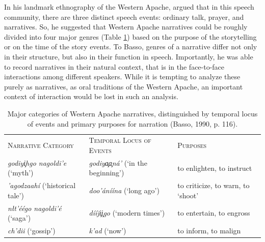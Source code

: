 \documentclass[12pt]{article}
\begin{document}
In his landmark ethnography of the Western Apache, \textcite{basso1990} argued that in this speech community, there are three distinct speech events: ordinary talk, prayer, and narratives. So, he suggested that Western Apache narratives could be roughly divided into four major genres (Table \ref{basso}) based on the purpose of the storytelling or on the time of the story events. To Basso, genres of a narrative differ not only in their structure, but also in their function in speech. Importantly, he was able to record narratives in their natural context, that is in the face-to-face interactions among different speakers. While it is tempting to analyze these purely as narratives, as oral traditions of the Western Apache, an important context of interaction would be lost in such an analysis.
\begin{table}[h]
\centering
\caption{Major categories of Western Apache narratives, distinguished by temporal locus of events and primary purposes for narration (Basso, 1990, p. 116).}
\label{basso}
\begin{tabular}{|p{2in} p{2.4in} p{1.6in}|} 
\hline
\textsc{Narrative Category} & \textsc{Temporal Locus of Events} & \textsc{Purposes}\\
\textit{godiy{\c i}hgo nagoldi'e} (`myth') & \textit{godiy{\c a\c a}n\'a'} (`in the beginning') & to enlighten, to instruct\\
\hline
\textit{'agodzaah\'i} (`historical tale') & \textit{doo'\'an\'i\'ina} (`long ago') & to criticize, to warn, to `shoot'\\ \hline
\textit{n\l t'\'e\'ego nagoldi'\'e} (`saga') & \textit{d\'i\'ij\c i\c igo} (`modern times') & to entertain, to engross\\ \hline
\textit{ch'dii} (`gossip') & \textit{k'ad} (`now') & to inform, to malign\\
\hline
\end{tabular}
\end{table}
\end{document}
